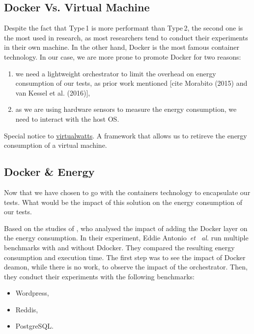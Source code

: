 \subsection{Docker Vs. Virtual Machine}
Despite the fact that \textsf{Type\,1} is more performant than \textsf{Type\,2}, the second one is the most used in research, as most researchers tend to conduct their experiments in their own machine.
In the other hand, Docker is the most famous container technology.
In our case, we are more prone to promote Docker for two reasons:
\begin{enumerate}
    \item we need a lightweight orchestrator to limit the overhead on energy consumption of our tests, as prior work mentioned [cite Morabito (2015) and van Kessel et al. (2016)],
    \item as we are using hardware sensors to measure the energy consumption, we need to interact with the host OS.
\end{enumerate}

Special notice to \href{https://github.com/powerapi-ng/virtualwatts}{virtualwatts}. A framework that allows us to retireve the energy consumption of a virtual machine.


\subsection{Docker \& Energy}
Now that we have chosen to go with the containers technology to encapsulate our tests.
What would be the impact of this solution on the energy consumption of our tests.

Based on the studies of \cite{santos2018does}, who analysed the impact of adding the Docker layer on the energy consumption.
In their experiment, Eddie Antonio~\emph{et~ al.} run multiple benchmarks with and without Ddocker. 
They compared the resulting energy consumption and execution time.
The first step was to see the impact of Docker deamon, while there is no work, to observe the impact of the orchestrator.
Then, they conduct their experiments with the following benchmarks:
\begin{itemize}
    \item Wordpress,
    \item Reddis,
    \item PostgreSQL.
\end{itemize}

